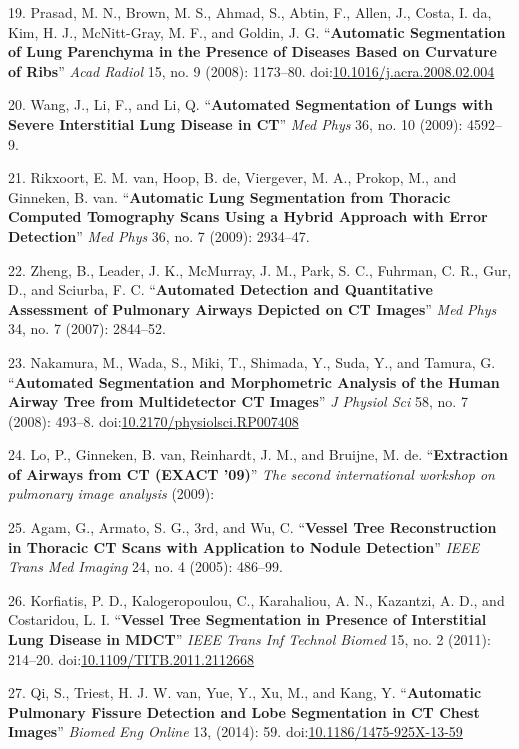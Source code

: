 \documentclass[11pt,]{article}
\begin{document}
19. Prasad, M. N., Brown, M. S., Ahmad, S., Abtin, F., Allen, J., Costa,
I. da, Kim, H. J., McNitt-Gray, M. F., and Goldin, J. G.
``\textbf{Automatic Segmentation of Lung Parenchyma in the Presence of
Diseases Based on Curvature of Ribs}'' \emph{Acad Radiol} 15, no. 9
(2008): 1173--80.
doi:\href{http://dx.doi.org/10.1016/j.acra.2008.02.004}{10.1016/j.acra.2008.02.004}

20. Wang, J., Li, F., and Li, Q. ``\textbf{Automated Segmentation of
Lungs with Severe Interstitial Lung Disease in CT}'' \emph{Med Phys} 36,
no. 10 (2009): 4592--9.

21. Rikxoort, E. M. van, Hoop, B. de, Viergever, M. A., Prokop, M., and
Ginneken, B. van. ``\textbf{Automatic Lung Segmentation from Thoracic
Computed Tomography Scans Using a Hybrid Approach with Error
Detection}'' \emph{Med Phys} 36, no. 7 (2009): 2934--47.

22. Zheng, B., Leader, J. K., McMurray, J. M., Park, S. C., Fuhrman, C.
R., Gur, D., and Sciurba, F. C. ``\textbf{Automated Detection and
Quantitative Assessment of Pulmonary Airways Depicted on CT Images}''
\emph{Med Phys} 34, no. 7 (2007): 2844--52.

23. Nakamura, M., Wada, S., Miki, T., Shimada, Y., Suda, Y., and Tamura,
G. ``\textbf{Automated Segmentation and Morphometric Analysis of the
Human Airway Tree from Multidetector CT Images}'' \emph{J Physiol Sci}
58, no. 7 (2008): 493--8.
doi:\href{http://dx.doi.org/10.2170/physiolsci.RP007408}{10.2170/physiolsci.RP007408}

24. Lo, P., Ginneken, B. van, Reinhardt, J. M., and Bruijne, M. de.
``\textbf{Extraction of Airways from CT (EXACT '09)}'' \emph{The second
international workshop on pulmonary image analysis} (2009):

25. Agam, G., Armato, S. G., 3rd, and Wu, C. ``\textbf{Vessel Tree
Reconstruction in Thoracic CT Scans with Application to Nodule
Detection}'' \emph{IEEE Trans Med Imaging} 24, no. 4 (2005): 486--99.

26. Korfiatis, P. D., Kalogeropoulou, C., Karahaliou, A. N., Kazantzi,
A. D., and Costaridou, L. I. ``\textbf{Vessel Tree Segmentation in
Presence of Interstitial Lung Disease in MDCT}'' \emph{IEEE Trans Inf
Technol Biomed} 15, no. 2 (2011): 214--20.
doi:\href{http://dx.doi.org/10.1109/TITB.2011.2112668}{10.1109/TITB.2011.2112668}

27. Qi, S., Triest, H. J. W. van, Yue, Y., Xu, M., and Kang, Y.
``\textbf{Automatic Pulmonary Fissure Detection and Lobe Segmentation in
CT Chest Images}'' \emph{Biomed Eng Online} 13, (2014): 59.
doi:\href{http://dx.doi.org/10.1186/1475-925X-13-59}{10.1186/1475-925X-13-59}
\end{document}
